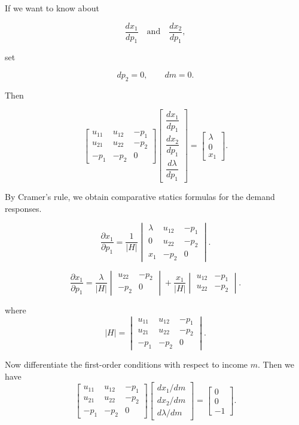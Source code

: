 If we want to know about

\[
\frac{dx_1}{dp_1}
\quad \text{and} \quad
\frac{dx_2}{dp_1},
\]

set

\[
dp_2=0,
\qquad
dm=0.
\]

Then

\[
\begin{bmatrix}
u_{11} & u_{12} & -p_1 \\
u_{21} & u_{22} & -p_2 \\
-p_1 & -p_2 & 0
\end{bmatrix}
\begin{bmatrix}
\dfrac{dx_1}{dp_1} \\
\dfrac{dx_2}{dp_1} \\
\dfrac{d\lambda}{dp_1}
\end{bmatrix}
=
\begin{bmatrix}
\lambda \\
0 \\
x_1
\end{bmatrix}.
\]

By Cramer's rule, we obtain comparative statics formulas for the demand responses.





\[
\frac{\partial x_1}{\partial p_1}
=
\frac{1}{|H|}
\begin{vmatrix}
\lambda & u_{12} & -p_1 \\
0 & u_{22} & -p_2 \\
x_1 & -p_2 & 0
\end{vmatrix}.
\]

\[
\frac{\partial x_1}{\partial p_1}
=
\frac{\lambda}{|H|}
\begin{vmatrix}
u_{22} & -p_2 \\
-p_2 & 0
\end{vmatrix}
+
\frac{x_1}{|H|}
\begin{vmatrix}
u_{12} & -p_1 \\
u_{22} & -p_2
\end{vmatrix}.
\]

where
\[
|H|
=
\begin{vmatrix}
u_{11} & u_{12} & -p_1 \\
u_{21} & u_{22} & -p_2 \\
-p_1 & -p_2 & 0
\end{vmatrix}.
\]

Now differentiate the first-order conditions with respect to income \(m\). Then we have
\[
\begin{bmatrix}
u_{11} & u_{12} & -p_1 \\
u_{21} & u_{22} & -p_2 \\
-p_1 & -p_2 & 0
\end{bmatrix}
\begin{bmatrix}
dx_1/dm \\
dx_2/dm \\
d\lambda/dm
\end{bmatrix}
=
\begin{bmatrix}
0 \\
0 \\
-1
\end{bmatrix}.
\]


